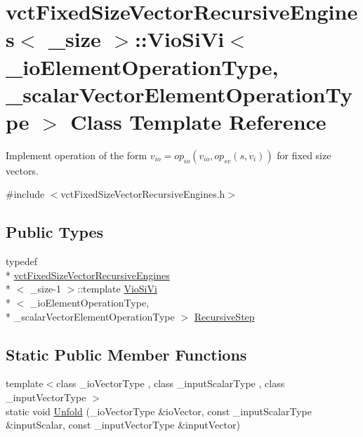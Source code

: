 \hypertarget{classvct_fixed_size_vector_recursive_engines_1_1_vio_si_vi}{\section{vct\-Fixed\-Size\-Vector\-Recursive\-Engines$<$ \-\_\-size $>$\-:\-:Vio\-Si\-Vi$<$ \-\_\-io\-Element\-Operation\-Type, \-\_\-scalar\-Vector\-Element\-Operation\-Type $>$ Class Template Reference}
\label{classvct_fixed_size_vector_recursive_engines_1_1_vio_si_vi}
}


Implement operation of the form $v_{io} = op_{io}(v_{io}, op_{sv}(s, v_i))$ for fixed size vectors.  




{\ttfamily \#include $<$vct\-Fixed\-Size\-Vector\-Recursive\-Engines.\-h$>$}

\subsection*{Public Types}
\begin{DoxyCompactItemize}
\item 
typedef \\*
\hyperlink{classvct_fixed_size_vector_recursive_engines}{vct\-Fixed\-Size\-Vector\-Recursive\-Engines}\\*
$<$ \-\_\-size-\/1 $>$\-::template \hyperlink{classvct_fixed_size_vector_recursive_engines_1_1_vio_si_vi}{Vio\-Si\-Vi}\\*
$<$ \-\_\-io\-Element\-Operation\-Type, \\*
\-\_\-scalar\-Vector\-Element\-Operation\-Type $>$ \hyperlink{classvct_fixed_size_vector_recursive_engines_1_1_vio_si_vi_adb732c70954b6a4f3ddd7b55b273dcc3}{Recursive\-Step}
\end{DoxyCompactItemize}
\subsection*{Static Public Member Functions}
\begin{DoxyCompactItemize}
\item 
{\footnotesize template$<$class \-\_\-io\-Vector\-Type , class \-\_\-input\-Scalar\-Type , class \-\_\-input\-Vector\-Type $>$ }\\static void \hyperlink{classvct_fixed_size_vector_recursive_engines_1_1_vio_si_vi_a894dd5deb6013d579cafdedd69d0be4a}{Unfold} (\-\_\-io\-Vector\-Type \&io\-Vector, const \-\_\-input\-Scalar\-Type \&input\-Scalar, const \-\_\-input\-Vector\-Type \&input\-Vector)
\end{DoxyCompactItemize}


